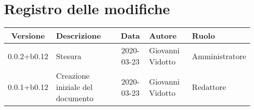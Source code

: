 \section*{Registro delle modifiche}

\begin{center}
	\begin{longtable}{|c|p{3.5cm}|c|p{3cm}|p{3cm}|}
	\hline
	\rowcolor{lighter-grayer}
	\textbf{Versione} & \textbf{Descrizione} & \textbf{Data} & \textbf{Autore} & \textbf{Ruolo} \\
	\hline
	\endfirsthead

	0.0.2+b0.12 & Stesura & 2020-03-23 & Giovanni Vidotto & Amministratore \\
	\hline
	0.0.1+b0.12 & Creazione iniziale del documento & 2020-03-23 & Giovanni Vidotto & Redattore \\
	\hline

	\end{longtable}
\end{center}
